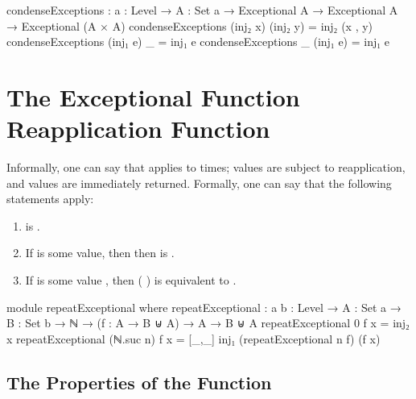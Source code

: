 \documentclass{report}
\begin{document}
\begin{code}
condenseExceptions : {a : Level} →
                     {A : Set a} →
                     Exceptional A →
                     Exceptional A →
                     Exceptional (A × A)
condenseExceptions (inj₂ x) (inj₂ y) = inj₂ (x , y)
condenseExceptions (inj₁ e) _ = inj₁ e
condenseExceptions _ (inj₁ e) = inj₁ e
\end{code}

\section{The Exceptional Function Reapplication Function}
Informally, one can say that     applies  to   times;  values are subject to reapplication, and  values are immediately returned.  Formally, one can say that the following statements apply:

\begin{enumerate}
  \item {}    is  .\label{enum:repeatExceptional-zeroIsInj2}
  \item If   is some  value, then then     is  .\label{enum:repeatExceptional-inj1GetsReturned}
  \item If   is some value  , then  \AgdaSymbol( \AgdaSymbol)   is equivalent to    .\label{enum:inj2GetsRepeat}
\end{enumerate}

\begin{code}
module repeatExceptional where
  repeatExceptional :
    {a b : Level} →
    {A : Set a} →
    {B : Set b} →
    ℕ → (f : A → B ⊎ A) → A → B ⊎ A
  repeatExceptional 0 f x = inj₂ x
  repeatExceptional (ℕ.suc n) f x =
    [_,_] inj₁ (repeatExceptional n f) (f x)
\end{code}

\subsection{The Properties of the Function}
\end{document}
